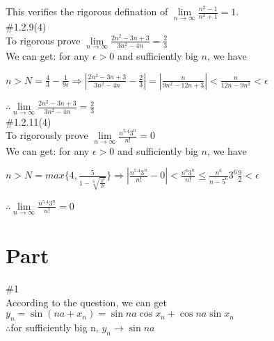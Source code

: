 \documentclass{article}
\begin{document}
\vspace{3.5mm}

This verifies the rigorous defination of $\lim \limits_{n \to \infty}\frac{n^2-1}{n^2+1}=1$.\\

\textcolor[rgb]{0.00,0.00,0.50}{\#1.2.9(4)}\\

To rigorous prove $\lim \limits_{n \to \infty}\frac{2n^2-3n+3}{3n^2-4n}=\frac{2}{3}$\\

We can get: for any $\epsilon>0$ and sufficiently big $n$, we have\\

\centerline{$n>N=\frac{4}{3}-\frac{1}{9\epsilon}\Rightarrow\left|\frac{2n^2-3n+3}{3n^2-4n}-\frac{2}{3}\right|=\left|\frac{n}{9n^2-12n+3}\right|<\frac{n}{12n-9n^2}<\epsilon$}

$\therefore$\qquad$\lim \limits_{n \to \infty}\frac{2n^2-3n+3}{3n^2-4n}=\frac{2}{3}$\\

\textcolor[rgb]{0.00,0.00,0.50}{\#1.2.11(4)}\\

To rigorously prove $\lim \limits_{n \to \infty}\frac{n^{5.4}3^n}{n!} = 0$\\

We can get: for any $\epsilon>0$ and sufficiently big $n$, we have\\

\centerline{$n>N=max\{4,\frac{5}{1-\sqrt[6]{\frac{3^8}{2\epsilon}}}\}\Rightarrow\left|\frac{n^{5.4}3^n}{n!}-0\right|<\frac{{n^6}3^n}{n!}\leq\frac{n^6}{{n-5}^6}3^6\frac{9}{2}<\epsilon$}

$\therefore$\qquad$\lim \limits_{n \to \infty}\frac{n^{5.4}3^n}{n!}=0$\\

\section{\textcolor[rgb]{0.70,0.00,0.00}{Part \uppercase\expandafter{}}}

\vspace{3.5mm}

\textcolor[rgb]{0.00,0.00,0.50}{\#1}\\

According to the question, we can get $y_n=\sin{(na+x_n)}=\sin{na}\cos{x_n}+\cos{na}\sin{x_n}$\\

$\therefore$\qquad for sufficiently big n, $y_n\rightarrow\sin{na}$\\
\end{document}
